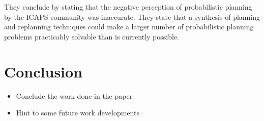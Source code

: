 \documentclass[runningheads,a4paper]{llncs}
\begin{document}
They conclude by stating that the negative perception of probabilistic planning by the ICAPS community was inaccurate. They state that a synthesis of planning and replanning techniques could make a larger number of probabilistic planning problems practicably solvable than is currently possible.




\section{Conclusion}

\begin{itemize}
	\item Conclude the work done in the paper
	\item Hint to some future work developments
\end{itemize}

%




\end{document}
